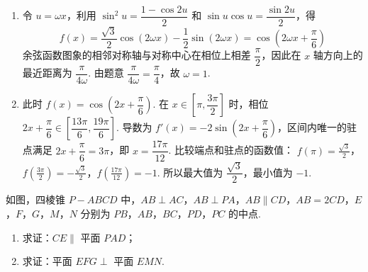 \begin{solution}
\begin{enumerate}
\item 令 \(u=\omega x\)，利用 \(\sin^2u=\dfrac{1-\cos2u}{2}\) 和 \(\sin u\cos u=\dfrac{\sin2u}{2}\)，得
\[
f(x)=\frac{\sqrt{3}}{2}\cos(2\omega x)-\frac{1}{2}\sin(2\omega x)=\cos\left(2\omega x+\frac{\pi}{6}\right)
\]
余弦函数图象的相邻对称轴与对称中心在相位上相差 \(\dfrac{\pi}{2}\)，因此在 \(x\) 轴方向上的最近距离为 \(\dfrac{\pi}{4\omega}\). 由题意 \(\dfrac{\pi}{4\omega}=\dfrac{\pi}{4}\)，故 \(\omega=1\).
\item 此时 \(f(x)=\cos\left(2x+\dfrac{\pi}{6}\right)\). 在 \(x\in\left[\pi,\dfrac{3\pi}{2}\right]\) 时，相位 \(2x+\dfrac{\pi}{6}\in\left[\dfrac{13\pi}{6},\dfrac{19\pi}{6}\right]\). 导数为 \(f'(x)=-2\sin\left(2x+\dfrac{\pi}{6}\right)\)，区间内唯一的驻点满足 \(2x+\dfrac{\pi}{6}=3\pi\)，即 \(x=\dfrac{17\pi}{12}\). 比较端点和驻点的函数值：
\(f(\pi)=\frac{\sqrt{3}}{2}\)，\(f\left(\frac{3\pi}{2}\right)=-\frac{\sqrt{3}}{2}\)，\(f\left(\frac{17\pi}{12}\right)=-1\).
所以最大值为 \(\dfrac{\sqrt{3}}{2}\)，最小值为 \(-1\).
\end{enumerate}
\end{solution}

\begin{problem}
如图，四棱锥 \(P - ABCD\) 中，\(AB \perp AC\)，\(AB \perp PA\)，\(AB \parallel CD\)，\(AB = 2CD\)，\(E\)，\(F\)，\(G\)，\(M\)，\(N\) 分别为 \(PB\)，\(AB\)，\(BC\)，\(PD\)，\(PC\) 的中点.

\begin{enumerate}
\item 求证：\(CE \parallel\) 平面 \(PAD\)；
\item 求证：平面 \(EFG \perp\) 平面 \(EMN\).
\end{enumerate}

\end{problem}

